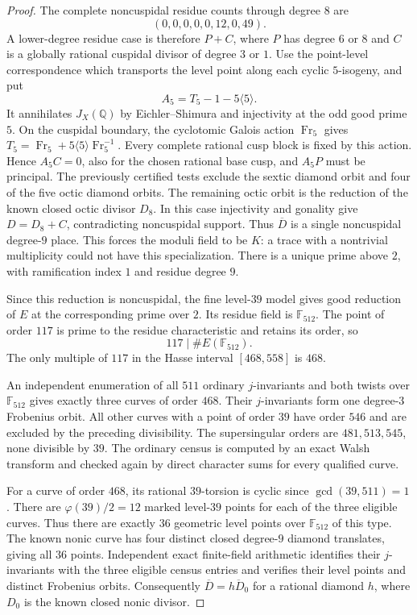 \begin{proof}
The complete noncuspidal residue counts through degree $8$ are
\[
 (0,0,0,0,0,12,0,49).
\]
A lower-degree residue case is therefore $P+C$, where $P$ has degree $6$ or $8$ and $C$ is a globally rational cuspidal divisor of degree $3$ or $1$.
Use the point-level correspondence which transports the level point along each cyclic $5$-isogeny, and put
\[
 A_5=T_5-1-5\langle5\rangle.
\]
It annihilates $J_X(\mathbb Q)$ by Eichler--Shimura and injectivity at the odd good prime $5$.
On the cuspidal boundary, the cyclotomic Galois action $\operatorname{Fr}_5$ gives
$T_5=\operatorname{Fr}_5+5\langle5\rangle\operatorname{Fr}_5^{-1}$.
Every complete rational cusp block is fixed by this action.
Hence $A_5C=0$, also for the chosen rational base cusp, and $A_5P$ must be principal.
The previously certified tests exclude the sextic diamond orbit and four of the five octic diamond orbits.
The remaining octic orbit is the reduction of the known closed octic divisor $D_8$.
In this case injectivity and gonality give $D=D_8+C$, contradicting noncuspidal support.
Thus $\overline D$ is a single noncuspidal degree-$9$ place.
This forces the moduli field to be $K$: a trace with a nontrivial multiplicity could not have this specialization.
There is a unique prime above $2$, with ramification index $1$ and residue degree $9$.

Since this reduction is noncuspidal, the fine level-$39$ model gives good reduction of $E$ at the corresponding prime over $2$.
Its residue field is $\mathbb F_{512}$.
The point of order $117$ is prime to the residue characteristic and retains its order, so
\[
 117\mid\#E(\mathbb F_{512}).
\]
The only multiple of $117$ in the Hasse interval $[468,558]$ is $468$.

An independent enumeration of all $511$ ordinary $j$-invariants and both twists over $\mathbb F_{512}$ gives exactly three curves of order $468$.
Their $j$-invariants form one degree-$3$ Frobenius orbit.
All other curves with a point of order $39$ have order $546$ and are excluded by the preceding divisibility.
The supersingular orders are $481,513,545$, none divisible by $39$.
The ordinary census is computed by an exact Walsh transform and checked again by direct character sums for every qualified curve.

For a curve of order $468$, its rational $39$-torsion is cyclic since $\gcd(39,511)=1$.
There are $\varphi(39)/2=12$ marked level-$39$ points for each of the three eligible curves.
Thus there are exactly $36$ geometric level points over $\mathbb F_{512}$ of this type.
The known nonic curve has four distinct closed degree-$9$ diamond translates, giving all $36$ points.
Independent exact finite-field arithmetic identifies their $j$-invariants with the three eligible census entries and verifies their level points and distinct Frobenius orbits.
Consequently $\overline D=\overline {hD_0}$ for a rational diamond $h$, where $D_0$ is the known closed nonic divisor.


\end{proof}
